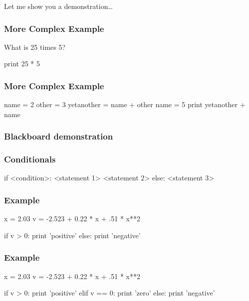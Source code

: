 \begin{frame}[fragile]

\bigskip
\bigskip
\bigskip
Let me show you a demonstration\ldots



\end{frame}

\begin{frame}[fragile]
\frametitle{More Complex Example}

What is 25 times 5?

\pause
\begin{python}
print 25 * 5
\end{python}
\end{frame}

\begin{frame}[fragile]
\frametitle{More Complex Example}

\begin{python}
name = 2
other = 3
yetanother = name + other
name = 5
print yetanother + name
\end{python}
\end{frame}

\begin{frame}[fragile]
\frametitle{Blackboard demonstration}

\end{frame}

\begin{frame}[fragile]
\frametitle{Conditionals}

\begin{python}

if <condition>:
    <statement 1>
    <statement 2>
else:
    <statement 3>

\end{python}
\end{frame}


\begin{frame}[fragile]
\frametitle{Example}

\begin{python}
x = 2.03
v = -2.523 + 0.22 * x  + .51 * x**2

if v > 0:
    print 'positive'
else:
    print 'negative'
\end{python}

\end{frame}

\begin{frame}[fragile]
\frametitle{Example}

\begin{python}
x = 2.03
v = -2.523 + 0.22 * x  + .51 * x**2

if v > 0:
    print 'positive'
elif v == 0:
    print 'zero'
else:
    print 'negative'
\end{python}

\end{frame}


